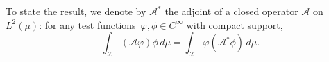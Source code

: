 To state the result, we denote by $\mathcal{A}^*$ the adjoint of a closed operator $\mathcal{A}$ on $L^2(\mu)$: for any test functions~$\varphi, \phi \in C^\infty$ with compact support,
%
\begin{equation}
    \int_\mathcal{X} (\mathcal{A}\varphi)\phi \, d\mu = \int_\mathcal{X} \varphi(\mathcal{A}^*\phi) \, d\mu.
    \label{eq:Astar_adjoint}
\end{equation}
%
%


